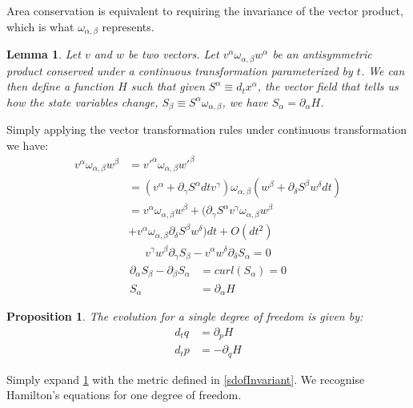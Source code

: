 \documentclass[twocolumn,floatfix,nofootinbib]{revtex4}   %
\theoremstyle{theorem}
\newtheorem{lem}[thm]{Lemma}
\newtheorem{prop}[thm]{Proposition}
\theoremstyle{definition}
\begin{document}
Area conservation is equivalent to requiring the invariance of the vector product, which is what $\omega_{\alpha, \beta}$ represents.

\begin{lem}\label{genAntisim}
Let $v$ and $w$ be two vectors. Let $v^{\alpha} \omega_{\alpha, \beta} w^{\alpha}$ be an antisymmetric product conserved under a continuous transformation parameterized by $t$. We can then define a function $H$ such that given $S^{\alpha} \equiv d_{t}x^{\alpha}$, the vector field that tells us how the state variables change, $S_{\beta} \equiv S^{\alpha} \omega_{\alpha, \beta}$, we have $S_{\alpha} = \partial_{\alpha}H$.
\end{lem}

Simply applying the vector transformation rules under continuous transformation we have:
\begin{align*}
v^{\alpha} \omega_{\alpha, \beta} w^{\beta} &= v'^{\alpha} \omega_{\alpha, \beta} w'^{\beta}  \\
&= (v^{\alpha} + \partial_{\gamma} S^{\alpha} dt v^{\gamma}) \omega_{\alpha, \beta} ( w^{\beta} + \partial_{\delta} S^{\beta} w^{\delta} dt) \\
&= v^{\alpha} \omega_{\alpha, \beta} w^{\beta} + (\partial_{\gamma} S^{\alpha} v^{\gamma} \omega_{\alpha, \beta} w^{\beta} \\
 &+ v^{\alpha} \omega_{\alpha, \beta} \partial_{\delta} S^{\beta} w^{\delta}) dt + O(dt^2)
\end{align*}
\begin{align*}
v^{\gamma} w^{\beta} \partial_{\gamma} S_{\beta} - v^{\alpha} w^{\delta} \partial_{\delta} S_{\alpha} = 0
\end{align*}
\begin{align*}
\partial_{\alpha} S_{\beta} - \partial_{\beta} S_{\alpha} &= curl(S_{\alpha}) = 0 \\
S_{\alpha} &= \partial_{\alpha}H
\end{align*}

\begin{prop}\label{sdofHam}
The evolution for a single degree of freedom is given by:
\begin{align*}
d_{t}q &= \partial_{p} H \\
d_{t}p &= - \partial_{q} H
\end{align*}
\end{prop}

Simply expand \ref{genAntisim} with the metric defined in \ref{sdofInvariant}. We recognise Hamilton's equations for one degree of freedom.
\end{document}
